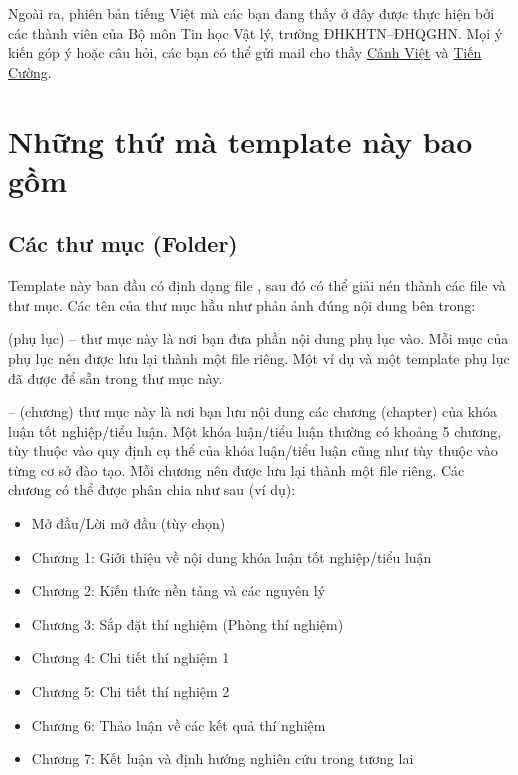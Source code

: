 Ngoài ra, phiên bản tiếng Việt mà các bạn đang thấy ở đây được thực hiện bởi các thành viên của Bộ môn Tin học Vật lý, trường ĐHKHTN--ĐHQGHN. Mọi ý kiến góp ý hoặc câu hỏi, các bạn có thể gửi mail cho thầy \href{mailto:vietncp@gmail.com }{Cảnh Việt} và \href{mailto:ngtiencuong@gmail.com }{Tiến Cường}.



\section{Những thứ mà template này bao gồm}

\subsection{Các thư mục (Folder)}

Template này ban đầu có định dạng file , sau đó có thể giải nén thành các file và thư mục. Các tên của thư mục hầu như phản ảnh đúng nội dung bên trong:

 (phụ lục) -- thư mục này là nơi bạn đưa phần nội dung phụ lục vào. Mỗi mục của phụ lục nên được lưu lại thành một file  riêng. Một ví dụ và một template phụ lục đã được để sẵn trong thư mục này.

 -- (chương) thư mục này là nơi bạn lưu nội dung các chương (chapter) của khóa luận tốt nghiệp/tiểu luận. Một khóa luận/tiểu luận thường có khoảng 5 chương, tùy thuộc vào quy định cụ thể của khóa luận/tiểu luận cũng như tùy thuộc vào từng cơ sở đào tạo. Mỗi chương nên được lưu lại thành một file  riêng. Các chương có thể được phân chia như sau (ví dụ):
\begin{itemize}
	\item Mở đầu/Lời mở đầu (tùy chọn)
	\item Chương 1: Giới thiệu về nội dung khóa luận tốt nghiệp/tiểu luận
	\item Chương 2: Kiến thức nền tảng và các nguyên lý
	\item Chương 3: Sắp đặt thí nghiệm (Phòng thí nghiệm)
	\item Chương 4: Chi tiết thí nghiệm 1
	\item Chương 5: Chi tiết thí nghiệm 2
	\item Chương 6: Thảo luận về các kết quả thí nghiệm
	\item Chương 7: Kết luận và định hướng nghiên cứu trong tương lai
\end{itemize}

